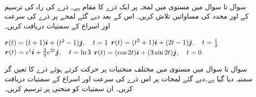 \\
سوال  تا سوال  میں مستوی  میں لمحہ  پر  ایک ذرے کا مقام  ہے۔  ذرے کی راہ کی ترسیم کے  اور  محدد کی مساواتیں تلاش کریں۔ اس کے بعد دیے گئے لمحے پر ذرے کی سرعت اور اسراع کے سمتیات دریافت کریں۔

${{\boldsymbol{r}}}(t)=(t+1){\boldsymbol{i}}+(t^2-1){\boldsymbol{j}},\quad t=1$
${{\boldsymbol{r}}}(t)=(t^2+1){\boldsymbol{i}}+(2t-1){\boldsymbol{j}},\quad t=\frac{1}{2}$
${{\boldsymbol{r}}}(t)=e^t{\boldsymbol{i}}+\frac{2}{9}e^{2t}{\boldsymbol{j}},\quad t=\ln 3$
${{\boldsymbol{r}}}(t)=(\cos 2t){\boldsymbol{i}}+(3\sin 2t){\boldsymbol{j}},\quad t=0$

سوال  تا سوال  میں مستوی  میں مختلف منحنیات پر حرکت کرتے ہوئے    ذرے کا  تعین گر سمتیہ  دیا گیا ہے۔دیے گئے لمحات  پر اس ذرے کی   سرعت اور اسراع کے سمتیات دریافت کریں۔ ان سمتیات کو منحنی پر ترسیم کریں۔

